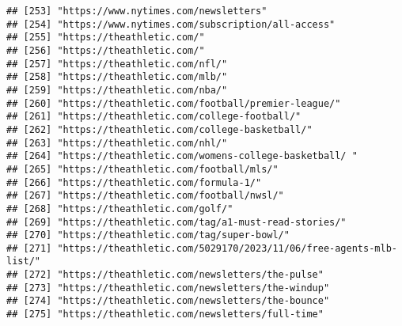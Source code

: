 \documentclass[
]{article}
\begin{document}
\begin{verbatim}
## [253] "https://www.nytimes.com/newsletters"                                                                       
## [254] "https://www.nytimes.com/subscription/all-access"                                                           
## [255] "https://theathletic.com/"                                                                                  
## [256] "https://theathletic.com/"                                                                                  
## [257] "https://theathletic.com/nfl/"                                                                              
## [258] "https://theathletic.com/mlb/"                                                                              
## [259] "https://theathletic.com/nba/"                                                                              
## [260] "https://theathletic.com/football/premier-league/"                                                          
## [261] "https://theathletic.com/college-football/"                                                                 
## [262] "https://theathletic.com/college-basketball/"                                                               
## [263] "https://theathletic.com/nhl/"                                                                              
## [264] "https://theathletic.com/womens-college-basketball/ "                                                       
## [265] "https://theathletic.com/football/mls/"                                                                     
## [266] "https://theathletic.com/formula-1/"                                                                        
## [267] "https://theathletic.com/football/nwsl/"                                                                    
## [268] "https://theathletic.com/golf/"                                                                             
## [269] "https://theathletic.com/tag/a1-must-read-stories/"                                                         
## [270] "https://theathletic.com/tag/super-bowl/"                                                                   
## [271] "https://theathletic.com/5029170/2023/11/06/free-agents-mlb-list/"                                          
## [272] "https://theathletic.com/newsletters/the-pulse"                                                             
## [273] "https://theathletic.com/newsletters/the-windup"                                                            
## [274] "https://theathletic.com/newsletters/the-bounce"                                                            
## [275] "https://theathletic.com/newsletters/full-time"                                                             

\end{verbatim}
\end{document}
